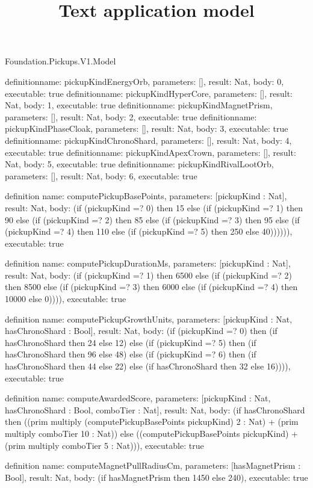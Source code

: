 \begin{lexlean}{Foundation.Pickups.V1.Model}
\title{Text application model}
\begin{semanticmodule}
definition{name: pickupKindEnergyOrb, parameters: [], result: Nat, body: 0, executable: true}
definition{name: pickupKindHyperCore, parameters: [], result: Nat, body: 1, executable: true}
definition{name: pickupKindMagnetPrism, parameters: [], result: Nat, body: 2, executable: true}
definition{name: pickupKindPhaseCloak, parameters: [], result: Nat, body: 3, executable: true}
definition{name: pickupKindChronoShard, parameters: [], result: Nat, body: 4, executable: true}
definition{name: pickupKindApexCrown, parameters: [], result: Nat, body: 5, executable: true}
definition{name: pickupKindRivalLootOrb, parameters: [], result: Nat, body: 6, executable: true}

definition{
  name: computePickupBasePoints,
  parameters: [pickupKind : Nat],
  result: Nat,
  body: (if (pickupKind =? 0) then 15 else (if (pickupKind =? 1) then 90 else (if (pickupKind =? 2) then 85 else (if (pickupKind =? 3) then 95 else (if (pickupKind =? 4) then 110 else (if (pickupKind =? 5) then 250 else 40)))))),
  executable: true
}

definition{
  name: computePickupDurationMs,
  parameters: [pickupKind : Nat],
  result: Nat,
  body: (if (pickupKind =? 1) then 6500 else (if (pickupKind =? 2) then 8500 else (if (pickupKind =? 3) then 6000 else (if (pickupKind =? 4) then 10000 else 0)))),
  executable: true
}

definition{
  name: computePickupGrowthUnits,
  parameters: [pickupKind : Nat, hasChronoShard : Bool],
  result: Nat,
  body: (if (pickupKind =? 0) then (if hasChronoShard then 24 else 12) else (if (pickupKind =? 5) then (if hasChronoShard then 96 else 48) else (if (pickupKind =? 6) then (if hasChronoShard then 44 else 22) else (if hasChronoShard then 32 else 16)))),
  executable: true
}

definition{
  name: computeAwardedScore,
  parameters: [pickupKind : Nat, hasChronoShard : Bool, comboTier : Nat],
  result: Nat,
  body: (if hasChronoShard then ((prim multiply (computePickupBasePoints pickupKind) 2 : Nat) + (prim multiply comboTier 10 : Nat)) else ((computePickupBasePoints pickupKind) + (prim multiply comboTier 5 : Nat))),
  executable: true
}

definition{
  name: computeMagnetPullRadiusCm,
  parameters: [hasMagnetPrism : Bool],
  result: Nat,
  body: (if hasMagnetPrism then 1450 else 240),
  executable: true
}


\end{semanticmodule}
\end{lexlean}
